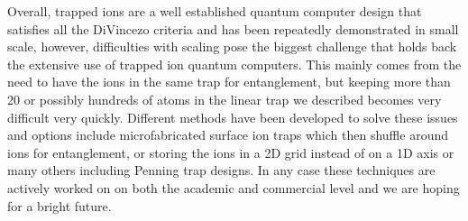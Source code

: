 Overall, trapped ions are a well established quantum computer design that satisfies all the DiVincezo criteria and has been repeatedly demonstrated in small scale, however, difficulties with scaling pose the biggest challenge that holds back the extensive use of trapped ion quantum computers.
This mainly comes from the need to have the ions in the same trap for entanglement, but keeping more than 20 or possibly hundreds of atoms in the linear trap we described becomes very difficult very quickly.
Different methods have been developed to solve these issues and options include microfabricated surface ion traps which then shuffle around ions for entanglement, or storing the ions in a 2D grid instead of on a 1D axis or many others including Penning trap designs.
In any case these techniques are actively worked on on both the academic and commercial level and we are hoping for a bright future.